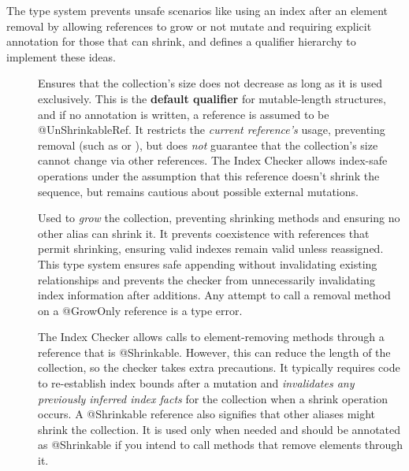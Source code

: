 The type system prevents unsafe scenarios like using an index after an element removal
by allowing references to grow or not mutate and requiring explicit annotation for those
that can shrink, and defines a qualifier hierarchy to implement these ideas.


\begin{description}
\item[]
  Ensures that the collection's size does not decrease as long as it is used exclusively.
  This is the \textbf{default qualifier} for mutable-length structures, and if no annotation is
  written, a reference is assumed to be @UnShrinkableRef. It restricts the \emph{current reference’s}
  usage, preventing removal (such as  or ), but does \emph{not} guarantee
  that the collection's size cannot change via other references. The Index Checker allows index-safe
  operations under the assumption that this reference doesn't shrink the sequence, but remains cautious
  about possible external mutations.

\item[]
  Used to \emph{grow} the collection, preventing shrinking methods and ensuring no other alias
  can shrink it. It prevents coexistence with references that permit shrinking, ensuring valid
  indexes remain valid unless reassigned. This type system ensures safe appending without
  invalidating existing relationships and prevents the checker from unnecessarily
  invalidating index information after additions. Any attempt to call a removal method on a
  @GrowOnly reference is a type error.

\item[]
  The Index Checker allows calls to element-removing methods through a reference that is @Shrinkable.
  However, this can reduce the length of the collection, so the checker takes extra precautions.
  It typically requires code to re-establish index bounds after a mutation and
  \emph{invalidates any previously inferred index facts} for the collection when a shrink operation occurs.
  A @Shrinkable reference also signifies that other aliases might shrink the collection.
  It is used only when needed and should be annotated as @Shrinkable if you intend to call methods that
  remove elements through it.


\end{description}
